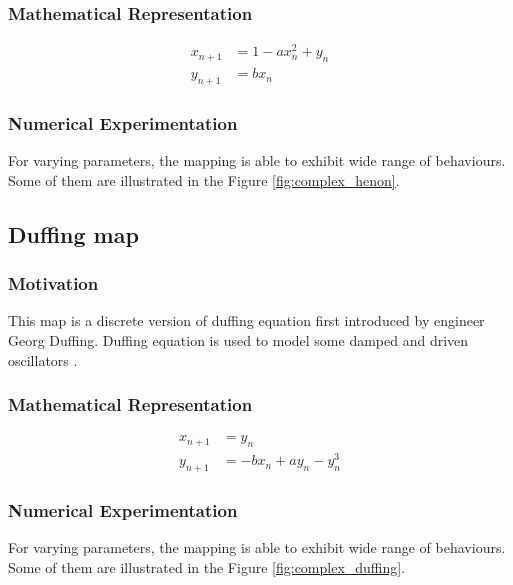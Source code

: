 \subsubsection{Mathematical Representation}
\begin{equation}
\begin{split}
    x_{n+1} &=  1 - a x_{n}^2 + y_{n} \\
    y_{n+1} &=  b x_{n}
\end{split}
\end{equation}

\subsubsection{Numerical Experimentation}
For varying parameters, the mapping is able to exhibit wide range of behaviours.
Some of them are illustrated in the Figure \ref{fig:complex_henon}.

\subsection{Duffing map}

\subsubsection{Motivation}

This map is a discrete version of duffing equation first introduced by engineer Georg Duffing.
Duffing equation is used to model some damped and driven oscillators \cite{Urrea2022}.


\subsubsection{Mathematical Representation}
\begin{equation}
\begin{split}
    x_{n+1} &=  y_{n} \\
    y_{n+1} &=  -b x_{n} + a y_{n} - y_{n}^3
\end{split}
\end{equation}

\subsubsection{Numerical Experimentation}
For varying parameters, the mapping is able to exhibit wide range of behaviours.
Some of them are illustrated in the Figure \ref{fig:complex_duffing}.

\endinput